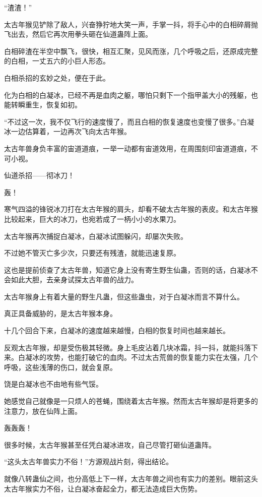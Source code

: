 \begin{this_body}
“渣渣！”

太古年猴见铲除了敌人，兴奋狰狞地大笑一声，手掌一抖，将手心中的白相碎屑抛飞出去，然后它再次用拳头砸在仙道蛊阵上面。

白相碎渣在半空中飘飞，很快，相互汇聚，见风而涨，几个呼吸之后，还原成完整的白相，一丈五六的小巨人形态。

白相杀招的玄妙之处，便在于此。

化为白相的白凝冰，已经不再是血肉之躯，哪怕只剩下一个指甲盖大小的残躯，也能转瞬重生，恢复如初。

“不过这一次，我不仅飞行的速度慢了，而且白相的恢复速度也变慢了很多。”白凝冰一边估算着，一边再次飞向太古年猴。

太古年兽身负丰富的宙道道痕，一举一动都有宙道效用，在周围刻印宙道道痕，不可小视。

仙道杀招——彻冰刀！

轰！

寒气四溢的锋锐冰刀打在太古年猴的肩头，却看不破太古年猴的表皮。和太古年猴比较起来，巨大的冰刀，也宛若成了一柄小小的水果刀。

太古年猴再次捕捉白凝冰，白凝冰试图躲闪，却屡次失败。

不过她不管灭亡多少次，只要还有残渣，就能迅速复原。

这也是提前侦查了太古年兽，知道它身上没有寄生野生仙蛊，否则的话，白凝冰不会如此大胆，去亲身试探太古年兽的战力。

太古年猴身上有着大量的野生凡蛊，但这些蛊虫，对于白凝冰而言不算什么。

真正具备威胁的，是太古年猴本身。

十几个回合下来，白凝冰的速度越来越慢，白相的恢复时间也越来越长。

反观太古年猴，却是受伤极其轻微。身上毛皮沾着几块冰霜，抖一抖，就能抖落下来。白凝冰的攻势，也能打破它的血肉。不过太古荒兽的恢复能力实在太强，几个呼吸，这些浅薄的伤口，就会复原。

饶是白凝冰也不由地有些气馁。

她感觉自己就像是一只烦人的苍蝇，围绕着太古年猴。然而太古年猴却是将更多的注意力，放在仙阵上面。

轰轰轰！

很多时候，太古年猴甚至任凭白凝冰进攻，自己尽管打砸仙道蛊阵。

“这头太古年兽实力不俗！”方源观战片刻，得出结论。

就像八转蛊仙之间，也分高低上下一样，太古年兽之间也有实力的差别。眼前这头太古年猴实力不俗，让白凝冰奋起全力，都无法造成巨大伤势。


\end{this_body}
